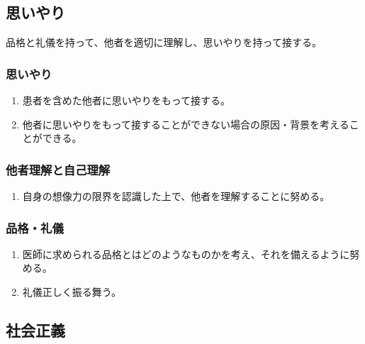 \documentclass[
]{ltjsarticle}
\providecommand{\tightlist}{%
  \setlength{\itemsep}{0pt}\setlength{\parskip}{0pt}}
\begin{document}
\hypertarget{ux601dux3044ux3084ux308a}{%
\subsection{思いやり}\label{ux601dux3044ux3084ux308a}}

品格と礼儀を持って、他者を適切に理解し、思いやりを持って接する。

\hypertarget{ux601dux3044ux3084ux308a-1}{%
\subsubsection{思いやり}\label{ux601dux3044ux3084ux308a-1}}

\begin{enumerate}
\def\labelenumi{\arabic{enumi}.}
\tightlist
\item
  患者を含めた他者に思いやりをもって接する。
\item
  他者に思いやりをもって接することができない場合の原因・背景を考えることができる。
\end{enumerate}

\hypertarget{ux4ed6ux8005ux7406ux89e3ux3068ux81eaux5df1ux7406ux89e3}{%
\subsubsection{他者理解と自己理解}\label{ux4ed6ux8005ux7406ux89e3ux3068ux81eaux5df1ux7406ux89e3}}

\begin{enumerate}
\def\labelenumi{\arabic{enumi}.}
\tightlist
\item
  自身の想像力の限界を認識した上で、他者を理解することに努める。
\end{enumerate}

\hypertarget{ux54c1ux683cux793cux5100}{%
\subsubsection{品格・礼儀}\label{ux54c1ux683cux793cux5100}}

\begin{enumerate}
\def\labelenumi{\arabic{enumi}.}
\tightlist
\item
  医師に求められる品格とはどのようなものかを考え、それを備えるように努める。
\item
  礼儀正しく振る舞う。
\end{enumerate}

\hypertarget{ux793eux4f1aux6b63ux7fa9}{%
\subsection{社会正義}\label{ux793eux4f1aux6b63ux7fa9}}
\end{document}
